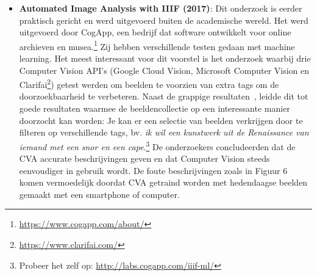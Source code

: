 \documentclass[fleqn,10pt]{voorstel}
\begin{document}
\begin{itemize}
	\item \textbf{Automated Image Analysis with IIIF (2017)}: Dit onderzoek is eerder praktisch gericht en werd uitgevoerd buiten de academische wereld. Het werd uitgevoerd door CogApp, een bedrijf dat software ontwikkelt voor online archieven en musea.\footnote{\url{https://www.cogapp.com/about/}} Zij hebben verschillende testen gedaan met machine learning. Het meest interessant voor dit voorstel is het onderzoek waarbij drie Computer Vision API's (Google Cloud Vision, Microsoft Computer Vision en Clarifai\footnote{\url{https://www.clarifai.com/}}) getest werden om beelden te voorzien van extra tags om de doorzoekbaarheid te verbeteren. Naast de grappige resultaten~\autocite{Roddis2018}, leidde dit tot goede resultaten waarmee de beeldencollectie op een interessante manier doorzocht kan worden: Je kan er een selectie van beelden verkrijgen door te filteren op verschillende tags, bv. \emph{ik wil een kunstwerk uit de Renaissance van iemand met een snor en een cape}.\footnote{Probeer het zelf op: \url{http://labs.cogapp.com/iiif-ml/}} De onderzoekers concludeerden dat de CVA accurate beschrijvingen geven en dat Computer Vision steeds eenvoudiger in gebruik wordt. De foute beschrijvingen zoals in Figuur 6 komen vermoedelijk doordat CVA getraind worden met hedendaagse beelden gemaakt met een smartphone of computer.~\autocite{Hindle2017}
	

\end{itemize}
\end{document}
